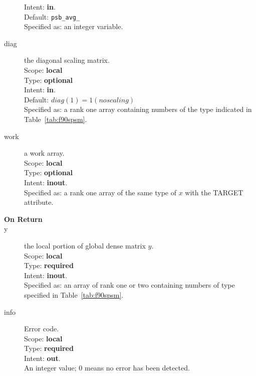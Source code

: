 \begin{description}
Intent: {\bf in}.\\
Default: \verb|psb_avg_|\\	
Specified as: an integer variable.
\item[diag] the diagonal scaling matrix.\\
Scope: {\bf local} \\
Type: {\bf optional}\\	
Intent: {\bf in}.\\
Default: $diag(1) = 1 (no scaling)$\\	
Specified as: a rank one  array containing numbers of the type
indicated in Table~\ref{tab:f90spsm}.
\item[work] a work array. \\
Scope: {\bf local} \\
Type: {\bf optional}\\	
Intent: {\bf inout}.\\
Specified as: a rank one array of the same type of $x$ with the
TARGET attribute. 

\item[\bf On Return] 
\item[y] the local portion of global dense matrix
$y$. %
\\
Scope: {\bf local} \\
Type: {\bf required} \\
Intent: {\bf inout}.\\
Specified as: an array of rank one or two
containing numbers of type specified in
Table~\ref{tab:f90spsm}.
\item[info] Error code.\\
Scope: {\bf local} \\
Type: {\bf required} \\
Intent: {\bf out}.\\
An integer value; 0 means no error has been detected. 
\end{description}





